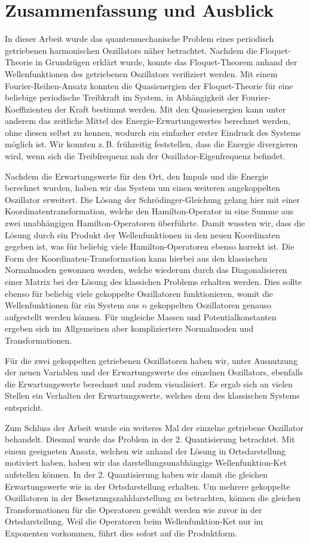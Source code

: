 \chapter{Zusammenfassung und Ausblick}
\label{6}
In dieser Arbeit wurde das quantenmechanische Problem eines periodisch getriebenen harmonischen Oszillators näher betrachtet.
Nachdem die Floquet-Theorie in Grundzügen erklärt wurde, konnte das Floquet-Theorem anhand der Wellenfunktionen des getriebenen Oszillators verifiziert werden.
Mit einem Fourier-Reihen-Ansatz konnten die Quasienergien der Floquet-Theorie für eine beliebige periodische Treibkraft im System, in Abhängigkeit der Fourier-Koeffizienten der Kraft bestimmt werden.
Mit den Quasienergien kann unter anderem das zeitliche Mittel des Energie-Erwartungswertes berechnet werden, ohne diesen selbst zu kennen, wodurch ein einfacher erster Eindruck des Systems möglich ist.
Wir konnten z.\,B. frühzeitig feststellen, dass die Energie divergieren wird, wenn sich die Treibfrequenz nah der Oszillator-Eigenfrequenz befindet.

Nachdem die Erwartungswerte für den Ort, den Impuls und die Energie berechnet wurden, haben wir das System um einen weiteren angekoppelten Oszillator erweitert.
Die Lösung der Schrödinger-Gleichung gelang hier mit einer Koordinatentransformation, welche den Hamilton-Operator in eine Summe aus zwei unabhängigen Hamilton-Operatoren überführte.
Damit wussten wir, dass die Lösung durch ein Produkt der Wellenfunktionen in den neuen Koordinaten gegeben ist, was für beliebig viele Hamilton-Operatoren ebenso korrekt ist.
Die Form der Koordinaten-Transformation kann hierbei aus den klassischen Normalmoden gewonnen werden, welche wiederum durch das Diagonalisieren einer Matrix bei der Lösung des klassichen Problems erhalten werden.
Dies sollte ebenso für beliebig viele gekoppelte Oszillatoren funktionieren, womit die Wellenfunktionen für ein System aus $n$ gekoppelten Oszillatoren genauso aufgestellt werden können.
Für ungleiche Massen und Potentialkonstanten ergeben sich im Allgemeinen aber kompliziertere Normalmoden und Transformationen.

Für die zwei gekoppelten getriebenen Oszillatoren haben wir, unter Ausnutzung der neuen Variablen und der Erwartungswerte des einzelnen Oszillators, ebenfalls die Erwartungswerte berechnet und zudem visualisiert.
Es ergab sich an vielen Stellen ein Verhalten der Erwartungswerte, welches dem des klassischen Systems entspricht.

Zum Schluss der Arbeit wurde ein weiteres Mal der einzelne getriebene Oszillator behandelt.
Diesmal wurde das Problem in der 2. Quantisierung betrachtet.
Mit einem geeigneten Ansatz, welchen wir anhand der Lösung in Ortsdarstellung motiviert haben, haben wir das darstellungsunabhängige Wellenfunktion-Ket aufstellen können.
In der 2. Quantisierung haben wir damit die gleichen Erwartungswerte wie in der Ortsdarstellung erhalten.
Um mehrere gekoppelte Oszillatoren in der Besetzungszahldarstellung zu betrachten, können die gleichen Transformationen für die Operatoren gewählt werden wie zuvor in der Ortsdarstellung.
Weil die Operatoren beim Wellenfunktion-Ket nur im Exponenten vorkommen, führt dies sofort auf die Produktform.
